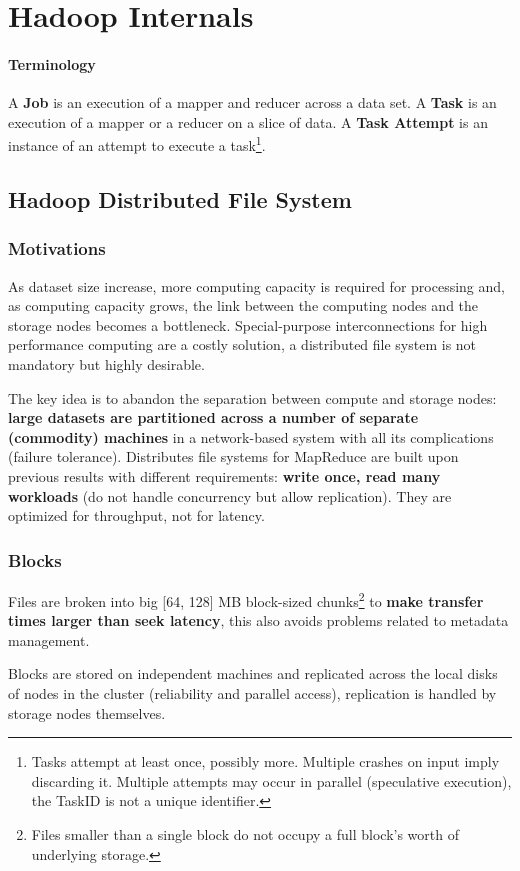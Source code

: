 \chapter{Hadoop Internals}
	\subsubsection{Terminology}
	\par
		A \textbf{Job} is an execution of a mapper and reducer across a data set.
		\newline
		A \textbf{Task} is an execution of a mapper or a reducer on a slice of data.
		\newline
		A \textbf{Task Attempt} is an instance of an attempt to execute a task\footnote{Tasks attempt at least once, possibly more. Multiple crashes on input imply discarding it. Multiple attempts may occur in parallel (speculative execution), the TaskID is not a unique identifier.}.
\section{Hadoop Distributed File System}
	\subsection{Motivations}
	\par
		As dataset size increase, more computing capacity is required for processing and, as computing capacity grows, the link between the computing nodes and the storage nodes becomes a bottleneck.
		\newline
		Special-purpose interconnections for high performance computing are a costly solution, a distributed file system is not mandatory but highly desirable.
		\newline
	\par
		The key idea is to abandon the separation between compute and storage nodes: \textbf{large datasets are partitioned across a number of separate (commodity) machines} in a network-based system with all its complications (failure tolerance).
		\newline
		Distributes file systems for MapReduce are built upon previous results with different requirements: \textbf{write once, read many workloads} (do not handle concurrency but allow replication). They are optimized for throughput, not for latency.
	\subsection{Blocks}
	\par
		Files are broken into big [64, 128] MB block-sized chunks\footnote{Files smaller than a single block do not occupy a full block's worth of underlying storage.} to \textbf{make transfer times larger than seek latency}, this also avoids problems related to metadata management.
	\par
		Blocks are stored on independent machines and replicated across the local disks of nodes in the cluster (reliability and parallel access), replication is handled by storage nodes themselves.
